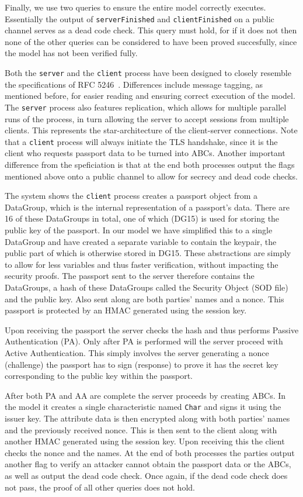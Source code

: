 Finally, we use two queries to ensure the entire model correctly executes. Essentially the output of \texttt{serverFinished} and \texttt{clientFinished} on a public channel serves as a dead code check. This query must hold, for if it does not then none of the other queries can be considered to have been proved succesfully, since the model has not been verified fully.

Both the \texttt{server} and the \texttt{client} process have been designed to closely resemble the specifications of RFC 5246~\cite{tls1.2}. Differences include message tagging, as mentioned before, for easier reading and ensuring correct execution of the model. The \texttt{server} process also features replication, which allows for multiple parallel runs of the process, in turn allowing the server to accept sessions from multiple clients. This represents the star-architecture of the client-server connections. Note that a \texttt{client} process will always initiate the TLS handshake, since it is the client who requests passport data to be turned into ABCs. Another important difference from the speficiation is that at the end both processes output the flags mentioned above onto a public channel to allow for secrecy and dead code checks.

The system shows the \texttt{client} process creates a passport object from a DataGroup, which is the internal representation of a passport's data. There are 16 of these DataGroups in total, one of which (DG15) is used for storing the public key of the passport. In our model we have simplified this to a single DataGroup and have created a separate variable to contain the keypair, the public part of which is otherwise stored in DG15. These abstractions are simply to allow for less variables and thus faster verification, without impacting the security proofs. The passport sent to the server therefore contains the DataGroups, a hash of these DataGroups called the Security Object (SOD file) and the public key. Also sent along are both parties' names and a nonce. This passport is protected by an HMAC generated using the session key.

Upon receiving the passport the server checks the hash and thus performs Passive Authentication (PA). Only after PA is performed will the server proceed with Active Authentication. This simply involves the server generating a nonce (challenge) the passport has to sign (response) to prove it has the secret key corresponding to the public key within the passport. 

After both PA and AA are complete the server proceeds by creating ABCs. In the model it creates a single characteristic named \texttt{Char} and signs it using the issuer key. The attribute data is then encrypted along with both parties' names and the previously received nonce. This is then sent to the client along with another HMAC generated using the session key. Upon receiving this the client checks the nonce and the names. At the end of both processes the parties output another flag to verify an attacker cannot obtain the passport data or the ABCs, as well as output the dead code check. Once again, if the dead code check does not pass, the proof of all other queries does not hold.

